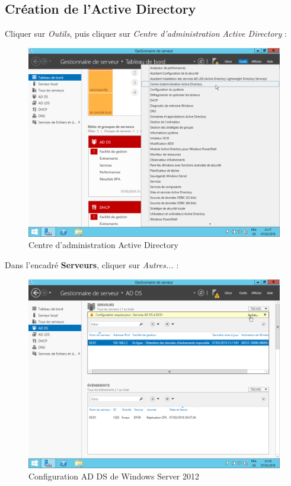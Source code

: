 \newpage
\subsection{Création de l'Active Directory}

Cliquer sur \textit{Outils}, puis cliquer sur \textit{Centre d'administration Active Directory} :
\begin{figure}[h!]
    \begin{center}
        \includegraphics[scale=0.6]{WS2012_Screenshots/53.png}
        \caption{Centre d'administration Active Directory}
        \label{WS2012_Screenshots/53}
    \end{center}
\end{figure}
\FloatBarrier

\newpage
Dans l'encadré \textbf{Serveurs}, cliquer sur \textit{Autres...} :
\begin{figure}[h!]
    \begin{center}
        \includegraphics[scale=0.6]{WS2012_Screenshots/54.png}
        \caption{Configuration AD DS de Windows Server 2012}
        \label{WS2012_Screenshots/54}
    \end{center}
\end{figure}
\FloatBarrier


